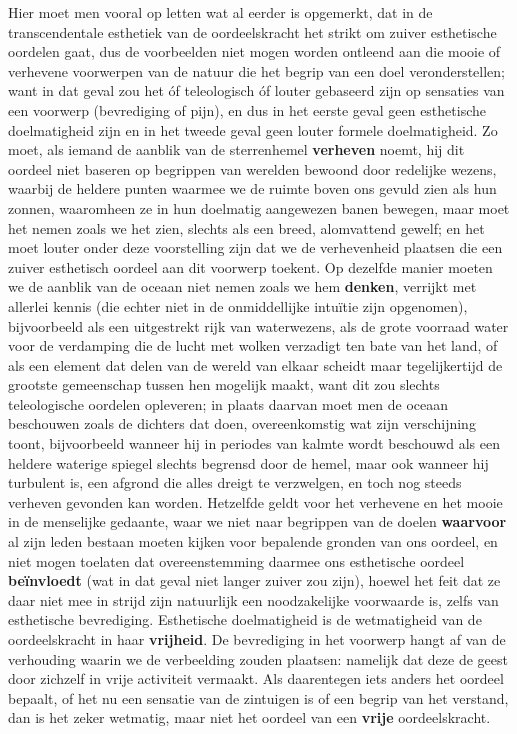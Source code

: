 Hier moet men vooral op letten wat al eerder is opgemerkt, dat in de transcendentale esthetiek van de oordeelskracht het strikt om zuiver esthetische oordelen gaat, dus de voorbeelden niet mogen worden ontleend aan die mooie of verhevene voorwerpen van de natuur die het begrip van een doel veronderstellen; want in dat geval zou het óf teleologisch óf louter gebaseerd zijn op sensaties van een voorwerp (bevrediging of pijn), en dus in het eerste geval geen esthetische doelmatigheid zijn en in het tweede geval geen louter formele doelmatigheid. Zo moet, als iemand de aanblik van de sterrenhemel \textbf{verheven} noemt, hij dit oordeel niet baseren op begrippen van werelden bewoond door redelijke wezens, waarbij de heldere punten waarmee we de ruimte boven ons gevuld zien als hun zonnen, waaromheen ze in hun doelmatig aangewezen banen bewegen, maar moet het nemen zoals we het zien, slechts als een breed, alomvattend gewelf; en het moet louter onder deze voorstelling zijn dat we de verhevenheid plaatsen die een zuiver esthetisch oordeel aan dit voorwerp toekent. Op dezelfde manier moeten we de aanblik van de oceaan niet nemen zoals we hem \textbf{denken}, verrijkt met allerlei kennis (die echter niet in de onmiddellijke intuïtie zijn opgenomen), bijvoorbeeld als een uitgestrekt rijk van waterwezens, als de grote voorraad water voor de verdamping die de lucht met wolken verzadigt ten bate van het land, of als een element dat delen van de wereld van elkaar scheidt maar tegelijkertijd de grootste gemeenschap tussen hen mogelijk maakt, want dit zou slechts teleologische oordelen opleveren; in plaats daarvan moet men de oceaan beschouwen zoals de dichters dat doen, overeenkomstig wat zijn verschijning toont, bijvoorbeeld wanneer hij in periodes van kalmte wordt beschouwd als een heldere waterige spiegel slechts begrensd door de hemel, maar ook wanneer hij turbulent is, een afgrond die alles dreigt te verzwelgen, en toch nog steeds verheven gevonden kan worden. Hetzelfde geldt voor het verhevene en het mooie in de menselijke gedaante, waar we niet naar begrippen van de doelen \textbf{waarvoor} al zijn leden bestaan moeten kijken voor bepalende gronden van ons oordeel, en niet mogen toelaten dat overeenstemming daarmee ons esthetische oordeel \textbf{beïnvloedt} (wat in dat geval niet langer zuiver zou zijn), hoewel het feit dat ze daar niet mee in strijd zijn natuurlijk een noodzakelijke voorwaarde is, zelfs van esthetische bevrediging.
Esthetische doelmatigheid is de wetmatigheid van de oordeelskracht in haar \textbf{vrijheid}. De bevrediging in het voorwerp hangt af van de verhouding waarin we de verbeelding zouden plaatsen: namelijk dat deze de geest door zichzelf in vrije activiteit vermaakt. Als daarentegen iets anders het oordeel bepaalt, of het nu een sensatie van de zintuigen is of een begrip van het verstand, dan is het zeker wetmatig, maar niet het oordeel van een \textbf{vrije} oordeelskracht.


